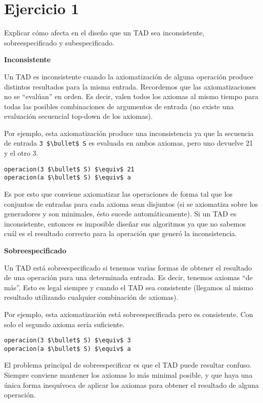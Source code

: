 \section*{Ejercicio 1}

Explicar cómo afecta en el diseño que un TAD sea inconsistente, sobreespecificado y subespecificado.

\textbf{Inconsistente}

Un TAD es inconsistente cuando la axiomatización de alguna operación produce distintos resultados para la misma entrada. Recordemos que las axiomatizaciones no se ``evalúan'' en orden. Es decir, valen todos los axiomas al mismo tiempo para todas las posibles combinaciones de argumentos de entrada (no existe una evaluación secuencial top-down de los axiomas).

Por ejemplo, esta axiomatización produce una inconsistencia ya que la secuencia de entrada \lstinline{3 $\bullet$ S} es evaluada en ambos axiomas, pero uno devuelve 21 y el otro 3.

\begin{lstlisting}
operacion(3 $\bullet$ S) $\equiv$ 21
operacion(a $\bullet$ S) $\equiv$ a
\end{lstlisting}

Es por esto que conviene axiomatizar las operaciones de forma tal que los conjuntos de entradas para cada axioma sean disjuntos (si se axiomatiza sobre los generadores y son minimales, ésto sucede automáticamente). Si un TAD es inconsistente, entonces es imposible diseñar sus algoritmos ya que no sabemos cuál es el resultado correcto para la operación que generó la inconsistencia.

\textbf{Sobreespecificado}

Un TAD está sobreespecificado si tenemos varias formas de obtener el resultado de una operación para una determinada entrada. Es decir, tenemos axiomas ``de más''. Esto es legal siempre y cuando el TAD sea consistente (llegamos al mismo resultado utilizando cualquier combinación de axiomas).

Por ejemplo, esta axiomatización está sobreespecificada pero es consistente. Con solo el segundo axioma sería suficiente.

\begin{lstlisting}
operacion(3 $\bullet$ S) $\equiv$ 3
operacion(a $\bullet$ S) $\equiv$ a
\end{lstlisting}

El problema principal de sobreespecificar es que el TAD puede resultar confuso. Siempre conviene mantener los axiomas lo más minimal posible, y que haya una única forma inequívoca de aplicar los axiomas para obtener el resultado de alguna operación.


